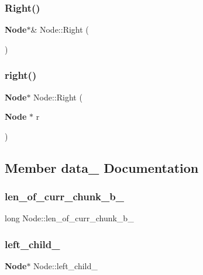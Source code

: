 \mbox{\label{class_node_a73fffe3df2c9e7ac4ebf52d7c65e8e38}} 
\subsubsection{Right()\hspace{0.1cm}{\footnotesize\ttfamily [1/2]}}
{\footnotesize\ttfamily \textbf{ Node}$\ast$\& Node\+::\+Right (\begin{DoxyParamCaption}{ }\end{DoxyParamCaption})\hspace{0.3cm}{\ttfamily [inline]}}

\mbox{\label{class_node_a2b9e785c9b94b7bb0e4617403542207b}} 
\subsubsection{right()\hspace{0.1cm}{\footnotesize\ttfamily [2/2]}}
{\footnotesize\ttfamily \textbf{ Node}$\ast$ Node\+::\+Right (\begin{DoxyParamCaption}\item[{\textbf{ Node} $\ast$}]{r }\end{DoxyParamCaption})\hspace{0.3cm}{\ttfamily [inline]}}



\subsection{Member data_ Documentation}
\mbox{\label{class_node_a3536573131e96ed591637abe7b532673}} 
\subsubsection{len_of_curr_chunk_b_}
{\footnotesize\ttfamily long Node\+::len_of_curr_chunk_b_\hspace{0.3cm}{\ttfamily [protected]}}

\mbox{\label{class_node_ab8c667ac8fdb120ed4c031682a9cdaee}} 
\subsubsection{left_child_}
{\footnotesize\ttfamily \textbf{ Node}$\ast$ Node\+::left_child_\hspace{0.3cm}{\ttfamily [protected]}}


